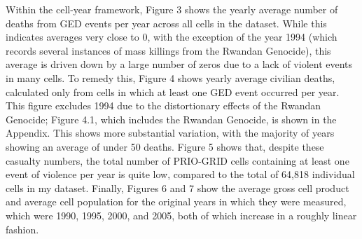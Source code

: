 Within the cell-year framework, Figure 3 shows the yearly average number of deaths from GED events per year across all cells in the dataset. While this indicates averages very close to 0, with the exception of the year 1994 (which records several instances of mass killings from the Rwandan Genocide), this average is driven down by a large number of zeros due to a lack of violent events in many cells. To remedy this, Figure 4 shows yearly average civilian deaths, calculated only from cells in which at least one GED event occurred per year. This figure excludes 1994 due to the distortionary effects of the Rwandan Genocide; Figure 4.1, which includes the Rwandan Genocide, is shown in the Appendix. This shows more substantial variation, with the majority of years showing an average of under 50 deaths. Figure 5 shows that, despite these casualty numbers, the total number of PRIO-GRID cells containing at least one event of violence per year is quite low, compared to the total of 64,818 individual cells in my dataset. Finally, Figures 6 and 7 show the average gross cell product and average cell population for the original years in which they were measured, which were 1990, 1995, 2000, and 2005, both of which increase in a roughly linear fashion.  

